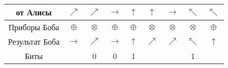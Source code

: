 \begin{tabular}{| c | c | c | c | c | c | c | c | c |}
    \hline
    от Алисы       & $\nearrow$ & $\nearrow$ & $\rightarrow$ & $\uparrow$ & $\uparrow$ & $\rightarrow$ & $\nwarrow$ & $\nwarrow$ \\
    \hline
    Приборы Боба   & $\oplus$ & $\otimes$ & $\oplus$ & $\oplus$ & $\otimes$ & $\otimes$ & $\otimes$ & $\oplus$ \\
    \hline
    Результат Боба & $\rightarrow$ & $\nearrow$ & $\rightarrow$ & $\uparrow$ & $\nearrow$ & $\nearrow$ & $\nwarrow$ & $\uparrow$ \\
    \hline
    Биты           &  & 0 & 0 & 1 &  &  & 1 &  \\
    \hline
\end{tabular}


